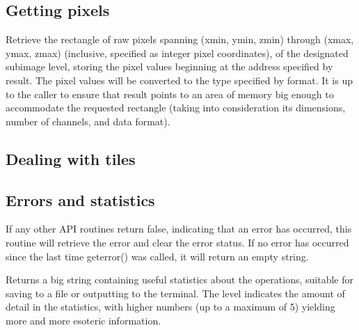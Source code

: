 \apiend

\newpage
\subsection{Getting pixels}
\label{sec:imagecache:api:getpixels}


Retrieve the rectangle of raw pixels spanning (xmin, ymin, zmin) through
(xmax, ymax, zmax) (inclusive, specified as integer pixel coordinates),
of the designated subimage {\cf level}, storing the pixel values
beginning at the address specified by result.  The pixel values will be
converted to the type specified by {\cf format}.  It is up to the caller
to ensure that result points to an area of memory big enough to
accommodate the requested rectangle (taking into consideration its
dimensions, number of channels, and data format).

\apiend

\subsection{Dealing with tiles}
\label{sec:imagecache:api:tiles}

\apiend

\apiend

\apiend

\subsection{Errors and statistics}
\label{sec:imagecache:api:geterror}
\label{sec:imagecache:api:getstats}

If any other API routines return {\cf false}, indicating that an error
has occurred, this routine will retrieve the error and clear the error
status.  If no error has occurred since the last time {\cf geterror()}
was called, it will return an empty string.
\apiend

Returns a big string containing useful statistics about the \ImageCache
operations, suitable for saving to a file or outputting to the terminal.
The {\cf level} indicates the amount of detail in the statistics,
with higher numbers (up to a maximum of 5) yielding more and more
esoteric information.
\apiend



\chapwidthend
